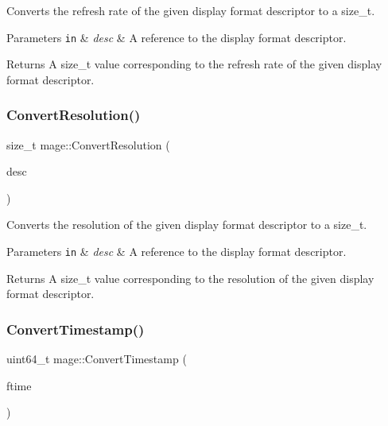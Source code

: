 Converts the refresh rate of the given display format descriptor to a {\ttfamily size\+\_\+t}.


\begin{DoxyParams}[1]{Parameters}
\mbox{\tt in}  & {\em desc} & A reference to the display format descriptor. \\
\hline
\end{DoxyParams}
\begin{DoxyReturn}{Returns}
A {\ttfamily size\+\_\+t} value corresponding to the refresh rate of the given display format descriptor. 
\end{DoxyReturn}
\hypertarget{namespacemage_a7f9c1859a590e3b8ccdd146b41392b7f}{}\label{namespacemage_a7f9c1859a590e3b8ccdd146b41392b7f} 
\subsubsection{\texorpdfstring{Convert\+Resolution()}{ConvertResolution()}}
{\footnotesize\ttfamily size\+\_\+t mage\+::\+Convert\+Resolution (\begin{DoxyParamCaption}\item[{const D\+X\+G\+I\+\_\+\+M\+O\+D\+E\+\_\+\+D\+E\+S\+C1 \&}]{desc }\end{DoxyParamCaption})}

Converts the resolution of the given display format descriptor to a {\ttfamily size\+\_\+t}.


\begin{DoxyParams}[1]{Parameters}
\mbox{\tt in}  & {\em desc} & A reference to the display format descriptor. \\
\hline
\end{DoxyParams}
\begin{DoxyReturn}{Returns}
A {\ttfamily size\+\_\+t} value corresponding to the resolution of the given display format descriptor. 
\end{DoxyReturn}
\hypertarget{namespacemage_a75f2f48306b962f530412769c6187aa5}{}\label{namespacemage_a75f2f48306b962f530412769c6187aa5} 
\subsubsection{\texorpdfstring{Convert\+Timestamp()}{ConvertTimestamp()}}
{\footnotesize\ttfamily uint64\+\_\+t mage\+::\+Convert\+Timestamp (\begin{DoxyParamCaption}\item[{const F\+I\+L\+E\+T\+I\+ME \&}]{ftime }\end{DoxyParamCaption})}


